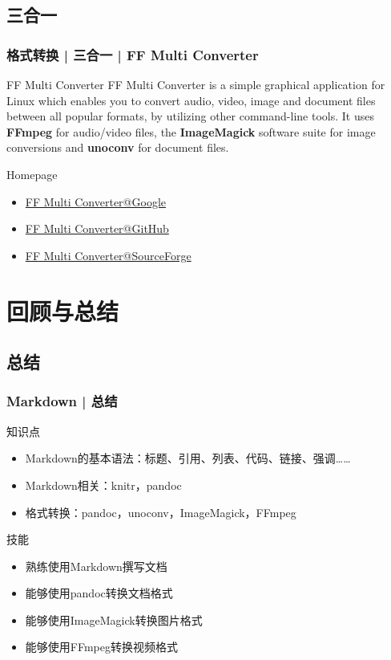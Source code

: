 \subsection{三合一}
\begin{frame}
  \frametitle{格式转换 | 三合一 | FF Multi Converter}
  \begin{block}{FF Multi Converter}
FF Multi Converter is a simple graphical application for Linux which enables you to convert audio, video, image and document files between all popular formats, by utilizing other command-line tools. It uses \textbf{FFmpeg} for audio/video files, the \textbf{ImageMagick} software suite for image conversions and \textbf{unoconv} for document files.
  \end{block}
  \begin{block}{Homepage}
    \begin{itemize}
      \item \href{https://sites.google.com/site/ffmulticonverter/}{FF Multi Converter@Google}
      \item \href{https://github.com/Ilias95/FF-Multi-Converter}{FF Multi Converter@GitHub}
      \item \href{https://sourceforge.net/projects/ffmulticonv/}{FF Multi Converter@SourceForge}
    \end{itemize}
  \end{block}
\end{frame}

\section{回顾与总结}
\subsection{总结}
\begin{frame}
  \frametitle{Markdown | 总结}
  \begin{block}{知识点}
    \begin{itemize}
      \item Markdown的基本语法：标题、引用、列表、代码、链接、强调……
      \item Markdown相关：knitr，pandoc
      \item 格式转换：pandoc，unoconv，ImageMagick，FFmpeg
    \end{itemize}
  \end{block}
  \begin{block}{技能}
    \begin{itemize}
      \item 熟练使用Markdown撰写文档
      \item 能够使用pandoc转换文档格式
      \item 能够使用ImageMagick转换图片格式
      \item 能够使用FFmpeg转换视频格式
    \end{itemize}
  \end{block}
\end{frame}

